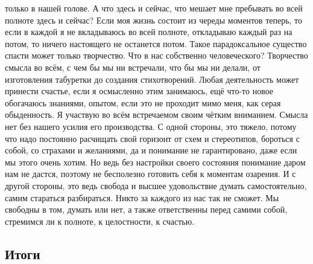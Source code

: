 только в нашей голове. А что здесь и сейчас, что мешает мне пребывать во всей
полноте здесь и сейчас? Если моя жизнь состоит из череды моментов теперь, то
если в каждой я не вкладываюсь во всей полноте, откладываю каждый раз на потом,
то ничего настоящего не останется потом. Такое парадоксальное существо спасти
может только творчество. Что в нас собственно человеческого? Творчество смысла
во всём, с чем бы мы ни встречали, что бы мы ни делали, от изготовления
табуретки до создания стихотворений. Любая деятельность может принести счастье,
если я осмысленно этим занимаюсь, ещё что-то новое обогачаюсь знаниями, опытом,
если это не проходит мимо меня, как серая обыденность. Я участвую во всём
встречаемом своим чётким вниманием. Смысла нет без нашего усилия его
производства. С одной стороны, это тяжело, потому что надо постоянно расчищать
свой горизонт от схем и стереотипов, бороться с собой, со страхами и желаниями,
да и понимание не гарантировано, даже если мы этого очень хотим. Но ведь без
настройки своего состояния понимание даром нам не дастся, поэтому не бесполезно
готовить себя к моментам озарения. И с другой стороны, это ведь свобода и высшее
удовольствие думать самостоятельно, самим стараться разбираться. Никто за
каждого из нас так не сможет. Мы свободны в том, думать или нет, а также
ответственны перед самими собой, стремимся ли к полноте, к целостности, к
счастью.

\subsection{Итоги}

